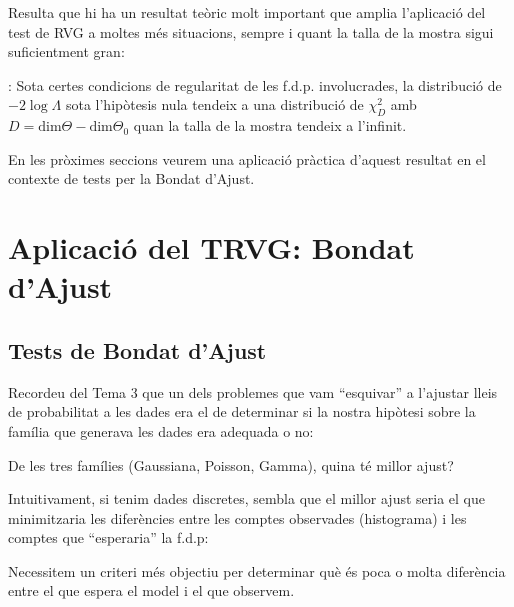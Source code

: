 \documentclass[letterpaper,10pt,english]{sphinxmanual}
\let\sphinxpxdimen\pdfpxdimen\else\newdimen\sphinxpxdimen
\begin{document}
Resulta que hi ha un resultat teòric molt important que amplia l’aplicació
del test de RVG a moltes més situacions, sempre i quant la talla de la mostra sigui suficientment gran:

: Sota certes condicions de regularitat de les f.d.p. involucrades,
la distribució de \(-2\log\Lambda\) sota l’hipòtesis nula tendeix a una distribució
de \(\chi^2_D\) amb \(D = \mbox{dim}\Theta - \mbox{dim}\Theta_0\) quan la talla
de la mostra tendeix a l’infinit.

En les pròximes seccions veurem una aplicació pràctica d’aquest resultat en el contexte
de tests per la Bondat d’Ajust.


\section{Aplicació del TRVG: Bondat d’Ajust}
\label{\detokenize{0_Intro/0_4_Tests:aplicacio-del-trvg-bondat-d-ajust}}

\subsection{Tests de Bondat d’Ajust}
\label{\detokenize{0_Intro/0_4_Tests:tests-de-bondat-d-ajust}}
Recordeu del Tema 3 que un dels problemes que vam “esquivar” a l’ajustar
lleis de probabilitat a les dades era el de determinar si la nostra hipòtesi sobre la família
que generava les dades era adequada o no:

\begin{figure}[htbp]
\centering

\noindent\sphinxincludegraphics[height=300\sphinxpxdimen]{{ajust}.png}
\end{figure}

De les tres famílies (Gaussiana, Poisson, Gamma), quina té millor ajust?

Intuitivament, si tenim dades discretes, sembla que el millor ajust seria el que
minimitzaria les diferències entre les comptes observades (histograma) i les
comptes que “esperaria” la f.d.p:

Necessitem un criteri més objectiu per determinar què és poca o molta diferència
entre el que espera el model i el que observem.
\end{document}

